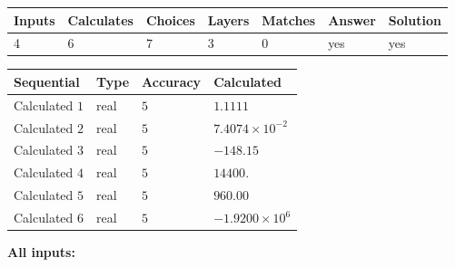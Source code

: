 \documentclass[12pt]{article}
\begin{document}
 

 
\vspace{0.3in}
   
   
   
   
\noindent\begin{tabular}{|l|l|l|l|l|l|l|}
 \hline
Inputs & Calculates & Choices & Layers & Matches & Answer & Solution \\ \hline
           4  & 
           6  & 
           7
  & 
           3  & 
           0  & 
  yes & 
  yes 
  \\ \hline
 \end{tabular}
   
   
   
   
\noindent{}
   
   
  
  
\noindent\begin{tabular}{|l|l|l|l|}
\hline
 Sequential & Type & Accuracy & Calculated \\ 
\hline
 
 
  Calculated $            1 $ & real & $            5  $ & 
 $ 1.1111 $ 
 \\  \hline  
 
 
  Calculated $            2 $ & real & $            5  $ & 
 $ 7.4074 \times 10^{-2} $ 
 \\  \hline  
 
 
  Calculated $            3 $ & real & $            5  $ & 
 $ -148.15 $ 
 \\  \hline  
 
 
  Calculated $            4 $ & real & $            5  $ & 
 $ 14400. $ 
 \\  \hline  
 
 
  Calculated $            5 $ & real & $            5  $ & 
 $ 960.00 $ 
 \\  \hline  
 
 
  Calculated $            6 $ & real & $            5  $ & 
 $ -1.9200 \times 10^{6} $ 
 \\  \hline  
 \end{tabular}
   
   
   
   
\noindent\vspace{0.1in}\hspace{-0.08in} {\textbf{\Large{All inputs: }}}
   
   
  
\end{document}
